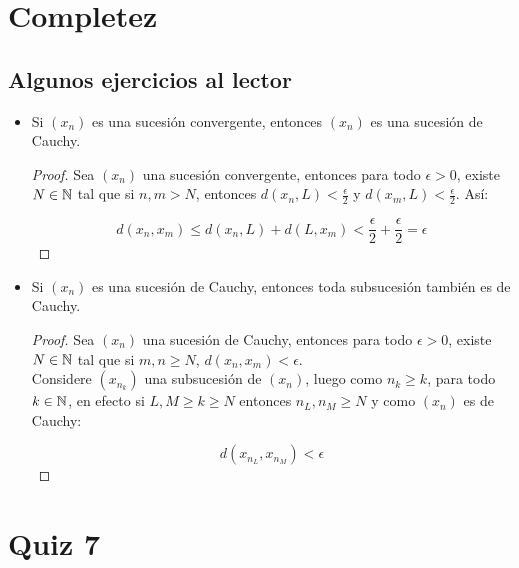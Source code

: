 \section{Completez}

\subsection{Algunos ejercicios al lector}

\begin{itemize}[label={✎},leftmargin=*]
    \item Si $(x_n)$ es una sucesión convergente, entonces $(x_n)$ es una sucesión de Cauchy.

    \begin{proof}
    Sea $(x_n)$ una sucesión convergente, entonces para todo $\epsilon>0$, existe $N\in \mathbb{N}$ tal que si $n,m>N$, entonces $d(x_n,L)<\frac{\epsilon}{2}$ y $d(x_m,L)<\frac{\epsilon}{2}$. Así:

    $$d(x_n,x_m)\leq d(x_n,L)+d(L,x_m)<\frac{\epsilon}{2}+\frac{\epsilon}{2}=\epsilon$$
    \end{proof}

    \item Si $(x_n)$ es una sucesión de Cauchy, entonces toda subsucesión también es de Cauchy.

    \begin{proof}
        Sea $(x_n)$ una sucesión de Cauchy, entonces para todo $\epsilon>0$, existe $N\in \mathbb{N}$ tal que si $m,n\geq N$, $d(x_n,x_m)<\epsilon$.\\

        Considere $(x_{n_k})$ una subsucesión de $(x_n)$, luego como $n_k\geq k$, para todo $k\in \mathbb{N}$, en efecto si $L,M\geq k\geq N$ entonces $n_L,n_M\geq N$ y como $(x_n)$ es de Cauchy:

        $$d(x_{n_L},x_{n_M})<\epsilon$$ 
    \end{proof}
\end{itemize}

\section{Quiz 7}

